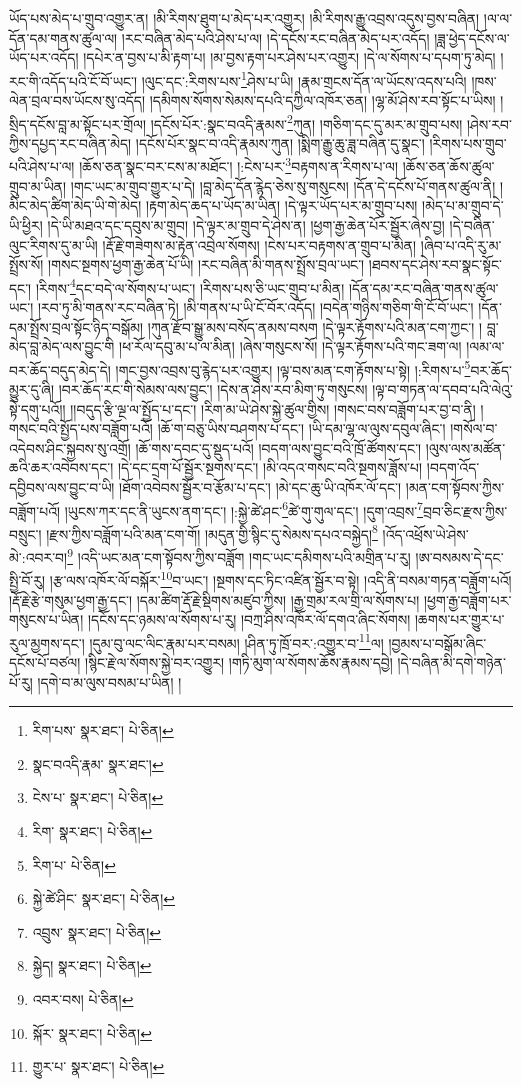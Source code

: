 ཡོད་པས་མེད་པ་གྲུབ་འགྱུར་ན། །མི་རིགས་ཐུག་པ་མེད་པར་འགྱུར། །མི་རིགས་རྒྱུ་འབྲས་འདུས་བྱས་བཞིན། །ལ་ལ་དོན་དམ་གནས་ཚུལ་ལ། །རང་བཞིན་མེད་པའི་ཤེས་པ་ལ། །དེ་དངོས་རང་བཞིན་མེད་པར་འདོད། །ཟླ་ཕྱེད་དངོས་ལ་ཡོད་པར་འདོད། །དཔེར་ན་བྱས་པ་མི་རྟག་པ། །མ་བྱས་རྟག་པར་ཤེས་པར་འགྱུར། །དེ་ལ་སོགས་པ་དཔག་ཏུ་མེད། །རང་གི་འདོད་པའི་ངོ་བོ་ཡང་། །ལུང་དང་:རིགས་པས་\footnote{རིག་པས་  སྣར་ཐང་།  པེ་ཅིན། }ཤེས་པ་ཡི། །རྣམ་གྲངས་དོན་ལ་ཡོངས་འདས་པའི། །ཁས་ལེན་བྲལ་བས་ཡོངས་སུ་འདོད། །དམིགས་སོགས་སེམས་དཔའི་དཀྱིལ་འཁོར་ཅན། །ལྷ་མོ་ཤེས་རབ་སྟོང་པ་ཡིས། །སྲིད་དངོས་བླ་མ་སྟོང་པར་གྲོལ། །དངོས་པོར་:སྣང་བའདི་རྣམས་\footnote{སྣང་བའདི་རྣམ་  སྣར་ཐང་། }ཀུན། །གཅིག་དང་དུ་མར་མ་གྲུབ་པས། །ཤེས་རབ་ཀྱིས་དཔྱད་རང་བཞིན་མེད། །དངོས་པོར་སྣང་བ་འདི་རྣམས་ཀུན། །སྨིག་རྒྱུ་ཆུ་ཟླ་བཞིན་དུ་སྣང་། །རིགས་པས་གྲུབ་པའི་ཤེས་པ་ལ། །ཆོས་ཅན་སྣང་བར་ངས་མ་མཐོང་། །:ངེས་པར་\footnote{ངེས་པ་  སྣར་ཐང་།  པེ་ཅིན། }བརྟགས་ན་རིགས་པ་ལ། །ཆོས་ཅན་ཆོས་ཚུལ་གྲུབ་མ་ཡིན། །གང་ཡང་མ་གྲུབ་གྱུར་པ་དེ། །བླ་མེད་དོན་རྙེད་ཅེས་སུ་གསུངས། །དོན་དེ་དངོས་པོ་གནས་ཚུལ་ནི། །མིང་མེད་ཚིག་མེད་ཡི་གེ་མེད། །རྟག་མེད་ཆད་པ་ཡོད་མ་ཡིན། །དེ་ལྟར་ཡོད་པར་མ་གྲུབ་པས། །མེད་པ་མ་གྲུབ་དེ་ཡི་ཕྱིར། །དེ་ཡི་མཐའ་དང་དབུས་མ་གྲུབ། །དེ་ལྟར་མ་གྲུབ་དེ་ཤེས་ན། །ཕྱག་རྒྱ་ཆེན་པོར་སྦྱོར་ཞེས་བྱ། །དེ་བཞིན་ལུང་རིགས་དུ་མ་ཡི། །རྡོ་རྗེ་གཟེགས་མ་རྟེན་འབྲེལ་སོགས། །ངེས་པར་བརྟགས་ན་གྲུབ་པ་མིན། །ཞིབ་པ་འདི་རུ་མ་སྤྲོས་སོ། །གསང་སྔགས་ཕྱག་རྒྱ་ཆེན་པོ་ཡི། །རང་བཞིན་མི་གནས་སྤྲོས་བྲལ་ཡང་། །ཐབས་དང་ཤེས་རབ་སྣང་སྟོང་དང་། །རིགས་\footnote{རིག་  སྣར་ཐང་།  པེ་ཅིན། }དང་བདེ་ལ་སོགས་པ་ཡང་། །རིགས་པས་ཅི་ཡང་གྲུབ་པ་མིན། །དོན་དམ་རང་བཞིན་གནས་ཚུལ་ཡང་། །རབ་ཏུ་མི་གནས་རང་བཞིན་ཏེ། །མི་གནས་པ་ཡི་ངོ་བོར་འདོད། །བདེན་གཉིས་གཅིག་གི་ངོ་བོ་ཡང་། །དོན་དམ་སྤྲོས་བྲལ་སྟོང་ཉིད་བསྒོམ། །ཀུན་རྫོབ་སྒྱུ་མས་བསོད་ནམས་བསག །དེ་ལྟར་རྟོགས་པའི་མན་ངག་ཀྱང་། །
བླ་མེད་བླ་མེད་ལས་བྱུང་གི །ཕ་རོལ་དབུ་མ་པ་ལ་མིན། །ཞེས་གསུངས་སོ། །དེ་ལྟར་རྟོགས་པའི་གང་ཟག་ལ། །ལམ་ལ་བར་ཆོད་བདུད་མེད་དེ། །གང་བྱས་འབྲས་བུ་རྙེད་པར་འགྱུར། །ལྟ་བས་མན་ངག་རྟོགས་པ་སྟེ། །:རིགས་པ་\footnote{རིག་པ་  པེ་ཅིན། }བར་ཆོད་མྱུར་དུ་ཞི། །བར་ཆོད་རང་གི་སེམས་ལས་བྱུང་། །དེས་ན་ཤེས་རབ་མིག་ཏུ་གསུངས། །ལྟ་བ་གཏན་ལ་དབབ་པའི་ལེའུ་སྟེ་དགུ་པའོ།། །།བདུད་རྩི་ལྔ་ལ་སྤྱོད་པ་དང་། །རིག་མ་ཡེ་ཤེས་སྐྱེ་ཚུལ་གྱིས། །གསང་བས་བཟློག་པར་བྱ་བ་ནི། །གསང་བའི་སྤྱོད་པས་བཟློག་པའོ། །ཆོ་ག་བཅུ་ཡིས་བཤགས་པ་དང་། །ཡི་དམ་ལྷ་ལ་ལུས་དབུལ་ཞིང་། །གསོལ་བ་འདེབས་ཤིང་སྐྱབས་སུ་འགྲོ། །ཆོ་གས་དབང་དུ་སྡུད་པའོ། །བདག་ལས་བྱུང་བའི་ཁྲོ་ཚོགས་དང་། །ལུས་ལས་མཚོན་ཆའི་ཆར་འབེབས་དང་། །དེ་དང་དྲག་པོ་སྦྱོར་སྔགས་དང་། །མི་འདའ་གསང་བའི་སྔགས་ཟློས་པ། །བདག་འོད་དབྱིབས་ལས་བྱུང་བ་ཡི། །ཐོག་འབེབས་སྦྱོར་བ་རྩོམ་པ་དང་། །མེ་དང་ཆུ་ཡི་འཁོར་ལོ་དང་། །མན་ངག་སྟོབས་ཀྱིས་བཟློག་པའོ། །ཡུངས་ཀར་དང་ནི་ཡུངས་ནག་དང་། །:སྐྱེ་ཚེ་ཤང་\footnote{སྐྱེ་ཚེ་ཤིང་  སྣར་ཐང་།  པེ་ཅིན། }ཚེ་གུ་གུལ་དང་། །དུག་འབྲས་\footnote{འབྲུས་  སྣར་ཐང་།  པེ་ཅིན། }བྲབ་ཅིང་རྫས་ཀྱིས་བསྲུང་། །རྫས་ཀྱིས་བཟློག་པའི་མན་ངག་གོ། །མདུན་གྱི་སྙིང་དུ་སེམས་དཔའ་བསྐྱེད།\footnote{སྐྱེད།  སྣར་ཐང་།  པེ་ཅིན། } །འོད་འཕྲོས་ཡེ་ཤེས་མེ་:འབར་བ།\footnote{འབར་བས།  པེ་ཅིན། } །འདི་ཡང་མན་ངག་སྟོབས་ཀྱིས་བཟློག །གང་ཡང་དམིགས་པའི་མགྲིན་པ་རུ། །ཨ་བསམས་དེ་དང་སྤྱི་བོ་རུ། །རྩ་ལས་འཁོར་ལོ་བསྐོར་\footnote{སྐོར་  སྣར་ཐང་།  པེ་ཅིན། }བ་ཡང་། །སྔགས་དང་ཏིང་འཛིན་སྦྱོར་བ་སྟེ། །འདི་ནི་བསམ་གཏན་བཟློག་པའོ། །རྡོ་རྗེ་རྩེ་གསུམ་ཕྱག་རྒྱ་དང་། །དམ་ཚིག་རྡོ་རྗེ་སྡིགས་མཛུབ་ཀྱིས། །རྒྱ་གྲམ་རལ་གྲི་ལ་སོགས་པ། །ཕྱག་རྒྱ་བཟློག་པར་གསུངས་པ་ཡིན། །དངོས་དང་ཉམས་ལ་སོགས་པ་རུ། །བཀྲ་ཤིས་འཁོར་ལོ་དགའ་ཞིང་སོགས། །ཆགས་པར་གྱུར་པ་རུལ་མྱགས་དང་། །དུམ་བུ་ལང་ལིང་རྣམ་པར་བསམ། །ཤིན་ཏུ་ཁྲོ་བར་:འགྱུར་བ་\footnote{གྱུར་པ་  སྣར་ཐང་།  པེ་ཅིན། }ལ། །བྱམས་པ་བསྒོམ་ཞིང་དངོས་པོ་བཙལ། །སྙིང་རྗེ་ལ་སོགས་སྐྱེ་བར་འགྱུར། །གཏི་མུག་ལ་སོགས་ཆོས་རྣམས་དབྱེ། །དེ་བཞིན་མི་དགེ་གཉེན་པོ་རུ། །དགེ་བ་མ་ལུས་བསམ་པ་ཡིན། །
